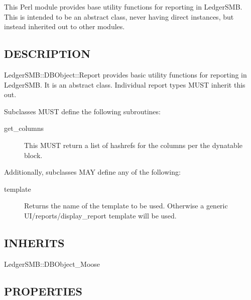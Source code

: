 \begin{description}
\begin{description}
\begin{description}
\begin{description}
\begin{description}
\begin{description}
\begin{description}
\begin{description}
\begin{description}
\begin{description}
This Perl module provides base utility functions for reporting in LedgerSMB.
This is intended to be an abstract class, never having direct instances, but
instead inherited out to other modules.

\subsection*{DESCRIPTION\label{LedgerSMB::DBObject::Report_DESCRIPTION}}


LedgerSMB::DBObject::Report provides basic utility functions for reporting in
LedgerSMB.  It is an abstract class.  Individual report types MUST inherit this
out.



Subclasses MUST define the following subroutines:

\begin{description}

\item[{get\_columns}] \mbox{}

This MUST return a list of hashrefs for the columns per the dynatable block.

\end{description}


Additionally, subclasses MAY define any of the following:

\begin{description}

\item[{template}] \mbox{}

Returns the name of the template to be used.  Otherwise a generic
UI/reports/display\_report template will be used.

\end{description}
\subsection*{INHERITS\label{LedgerSMB::DBObject::Report_INHERITS}}
\begin{description}

\item[{LedgerSMB::DBObject\_Moose}] \mbox{}\end{description}
\subsection*{PROPERTIES\label{LedgerSMB::DBObject::Report_PROPERTIES}}
\begin{description}


\end{description}
\end{description}
\end{description}
\end{description}
\end{description}
\end{description}
\end{description}
\end{description}
\end{description}
\end{description}
\end{description}
